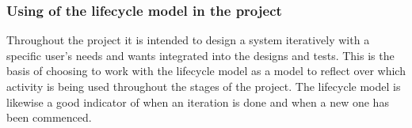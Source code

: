 \subsubsection{Using of the lifecycle model in the project}
Throughout the project it is intended to design a system iteratively with a specific user’s needs and wants integrated into the designs and tests. This is the basis of choosing to work with the lifecycle model as a model to reflect over which activity is being used throughout the stages of the project. The lifecycle model is likewise a good indicator of when an iteration is done and when a new one has been commenced.



